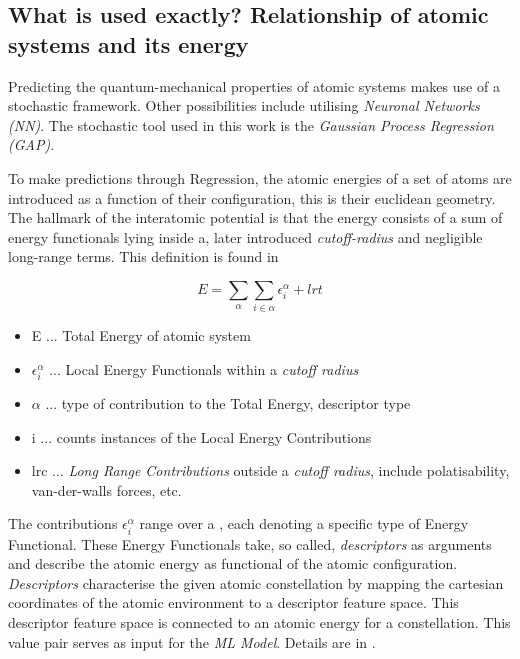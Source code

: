 \subsection{What is used exactly? Relationship of atomic systems and its energy}
\label{3.1.2}
Predicting the quantum-mechanical properties of atomic systems makes use of a stochastic framework. Other possibilities include utilising \textit{Neuronal Networks (NN)}. The stochastic tool used in this work is the \textit{Gaussian Process Regression (GAP)}. 

To make predictions through Regression, the atomic energies of a set of atoms are introduced as a function of their configuration, this is their euclidean geometry. The hallmark of the interatomic potential is that the energy consists of a sum of energy functionals lying inside a, later introduced \textit{cutoff-radius} and negligible long-range terms.  This definition is found in \cite[1051]{GAP-intro}

\begin{equation}
	E = \sum_{\alpha} \sum_{i\in \alpha} \epsilon_{i}^{\alpha} + lrt
	\label{eq:Egeneral}
\end{equation}

\begin{itemize}
	\item E ... Total Energy of atomic system
	\item $  \epsilon_{i}^{\alpha} $ ... Local Energy Functionals within a \textit{cutoff radius}
	\item $\alpha$ ... type of contribution to the Total Energy, descriptor type 
	\item i ... counts instances of the Local Energy Contributions  
	\item lrc ... \textit{Long Range Contributions} outside a \textit{cutoff radius}, include polatisability, van-der-walls forces, etc. 
\end{itemize}

The contributions $  \epsilon_{i}^{\alpha} $ range over a \alpha, each denoting a specific type of Energy Functional. These Energy Functionals take, so called, \textit{descriptors} as arguments and describe the atomic energy as functional of the atomic configuration. \textit{Descriptors} characterise the given atomic constellation by mapping the cartesian coordinates of the atomic environment to a descriptor feature space. This descriptor feature space is connected to an atomic energy for a constellation. This value pair serves as input for the \textit{ML Model}. Details are in \cite{GAP-intro}. 


